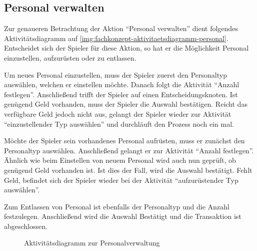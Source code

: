 \subsection{Personal verwalten}
\label{sec:fachkonzept-aktivitaetsdiagramm-personal}

Zur genaueren Betrachtung der Aktion “Personal verwalten” dient folgendes Aktivitätsdiagramm auf \vref{img:fachkonzept-aktivitaetsdiagramm-personal}. Entscheidet sich der Spieler für diese Aktion, so hat er die Möglichkeit Personal einzustellen, aufzurüsten oder zu entlassen. 

Um neues Personal einzustellen, muss der Spieler zuerst den Personaltyp auswählen, welchen er einstellen möchte. Danach folgt die Aktivität “Anzahl festlegen”. Anschließend trifft der Spieler auf einen Entscheidungsknoten. Ist genügend Geld vorhanden, muss der Spieler die Auswahl bestätigen. Reicht das verfügbare Geld jedoch nicht aus, gelangt der Spieler wieder zur Aktivität “einzustellender Typ auswählen” und durchläuft den Prozess noch ein mal. 

Möchte der Spieler sein vorhandenes Personal aufrüsten, muss er zunächst den Personaltyp auswählen. Anschließend gelangt er zur Aktivität “Anzahl festlegen”. Ähnlich wie beim Einstellen von neuem Personal wird auch nun geprüft, ob genügend Geld vorhanden ist. Ist dies der Fall, wird die Auswahl bestätigt. Fehlt Geld, befindet sich der Spieler wieder bei der Aktivität “aufzurüstender Typ auswählen”.

Zum Entlassen von Personal ist ebenfalls der Personaltyp und die Anzahl festzulegen. Anschließend wird die Auswahl Bestätigt und die Transaktion ist abgeschlossen. 

\begin{figure}[h]
  \centering
  \caption{Aktivitätsdiagramm zur Personalverwaltung}
  \label{img:fachkonzept-aktivitaetsdiagramm-personal}
\end{figure}
